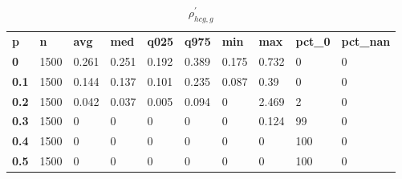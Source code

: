 \begin{table}[h]
 \centering 
\footnotesize
\caption{$\rho_{hcg,g}^\prime $}
\label{tab:alphahcgg}
\begin{tabular}[h]{| l l l l l l l l l l|
    } \hline
\textbf{ p} & \textbf{ n} & \textbf{ avg} & \textbf{ med} & \textbf{ q025} & \textbf{ q975} & \textbf{ min} & \textbf{ max} & \textbf{ pct\_0} & \textbf{ pct\_nan}
           \\
  \textbf{  0} & 1500 & 0.261 & 0.251 & 0.192 & 0.389 & 0.175 & 0.732 &   0 & 0
           \\
  \textbf{0.1} & 1500 & 0.144 & 0.137 & 0.101 & 0.235 & 0.087 &  0.39 &   0 & 0
           \\
  \textbf{0.2} & 1500 & 0.042 & 0.037 & 0.005 & 0.094 &     0 & 2.469 &   2 & 0
           \\
  \textbf{0.3} & 1500 &     0 &     0 &     0 &     0 &     0 & 0.124 &  99 & 0
           \\
  \textbf{0.4} & 1500 &     0 &     0 &     0 &     0 &     0 &     0 & 100 & 0
           \\
  \textbf{0.5} & 1500 &     0 &     0 &     0 &     0 &     0 &     0 & 100 & 0
           \\
 \hline \end{tabular}
 \end{table}
